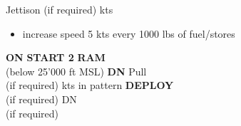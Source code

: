 \begin{checklistenumerate}
    \blueitem[Stores]\dotfill Jettison (if required)
    \blueitem[Airspeed] kts
    \begin{itemize}
        \item increase speed 5 kts every 1000 lbs of fuel/stores
    \end{itemize}
    \blueitem[EPU]\dotfill \textbf{ON}
    \dotfill \textbf{START 2}
    \dotfill \textbf{RAM}\\
    \hfill(below 25'000 ft MSL)
    \blueitem[LG Handle]\dotfill \textbf{DN}
    \dotfill Pull\\
    \hfill(if required)
    \blueitem[Airspeed] kts in pattern
    \dotfill \textbf{DEPLOY}\\
    \hfill(if required)
    \dotfill DN\\
    \hfill(if required)
\end{checklistenumerate}

\clearpage

\marginfigrestore